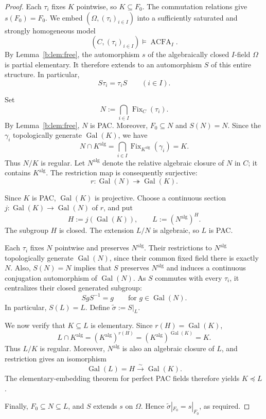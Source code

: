 \documentclass[11pt,a4paper]{amsart}
\theoremstyle{definition}
\newcommand{\alg}{\mathrm{alg}}
\DeclareMathOperator{\Gal}{Gal}
\DeclareMathOperator{\Fix}{Fix}
\begin{document}
\begin{proof}
Each $\tau_i$ fixes $K$ pointwise, so $K\subseteq F_0$.
The commutation relations give $s(F_0)=F_0$. We embed $(\Omega,(\tau_i)_{i\in I})$ into a sufficiently saturated
and strongly homogeneous model
\[
(C,(\tau_i)_{i\in I})\models\operatorname{ACFA}_I.
\]
By Lemma~\ref{b:lem:free}, the automorphism
$s$ of the algebraically closed $I$-field $\Omega$ is partial
elementary. It therefore extends to an automorphism $S$ of
this entire structure. In particular,
\[
S\tau_i=\tau_iS\qquad(i\in I).
\]

Set
\[
N:=\bigcap_{i\in I}\Fix_C(\tau_i).
\]
By Lemma~\ref{b:lem:free}, $N$ is PAC. Moreover,
$F_0\subseteq N$ and $S(N)=N$. Since the $\gamma_i$
topologically generate $\Gal(K)$, we have
\[
N\cap K^{\alg}
=\bigcap_{i\in I}\Fix_{K^{\alg}}(\gamma_i)
=K.
\]
Thus $N/K$ is regular. Let $N^{\alg}$ denote the relative
algebraic closure of $N$ in $C$; it contains $K^{\alg}$.
The restriction map is consequently surjective:
\[
r:\Gal(N)\twoheadrightarrow\Gal(K).
\]

Since $K$ is PAC, $\Gal(K)$ is projective. Choose a continuous
section $j:\Gal(K)\to\Gal(N)$ of $r$, and put
\[
H:=j(\Gal(K)),\qquad L:=(N^{\alg})^H.
\]
The subgroup $H$ is closed. The extension $L/N$ is algebraic,
so $L$ is PAC.

Each $\tau_i$ fixes $N$ pointwise and preserves $N^{\alg}$.
Their restrictions to $N^{\alg}$ topologically generate
$\Gal(N)$, since their common fixed field there is exactly $N$.
Also, $S(N)=N$ implies that $S$ preserves $N^{\alg}$ and
induces a continuous conjugation automorphism of $\Gal(N)$.
As $S$ commutes with every $\tau_i$, it centralizes their
closed generated subgroup:
\[
SgS^{-1}=g\qquad\text{for $g\in\Gal(N)$}.
\]
In particular, $S(L)=L$. Define
$\widetilde\sigma:=S|_L$.

We now verify that $K\subseteq L$ is elementary.
Since $r(H)=\Gal(K)$,
\[
L\cap K^{\alg}
=(K^{\alg})^{r(H)}
=(K^{\alg})^{\Gal(K)}
=K.
\]
Thus $L/K$ is regular. Moreover, $N^{\alg}$ is also an
algebraic closure of $L$, and restriction gives an isomorphism
\[
\Gal(L)=H\xrightarrow{\ \sim\ }\Gal(K).
\]
The elementary-embedding theorem for perfect PAC fields
therefore yields $K\preccurlyeq L$.

Finally, $F_0\subseteq N\subseteq L$, and $S$ extends $s$ on
$\Omega$. Hence $\widetilde\sigma|_{F_0}=s|_{F_0}$, as required.
\end{proof}
\end{document}
